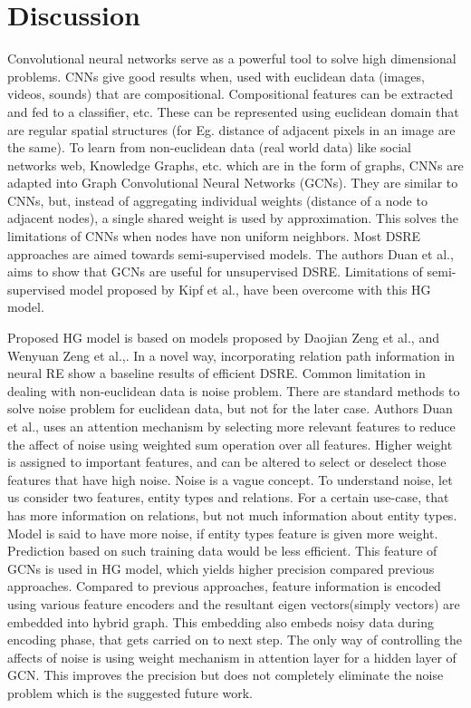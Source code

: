 \chapter{Discussion}
\label{ch:discussion}

Convolutional neural networks serve as a powerful tool to solve high dimensional problems. CNNs give good results when, used with euclidean data (images, videos, sounds) that are compositional. Compositional features can be extracted and fed to a classifier, etc. These can be represented using euclidean domain that are regular spatial structures (for Eg. distance of adjacent pixels in an image are the same). To learn from non-euclidean data (real world data) like social networks web, Knowledge Graphs, etc. which are in the form of graphs, CNNs are adapted into Graph Convolutional Neural Networks (GCNs). They are similar to CNNs, but, instead of aggregating individual weights (distance of a node to adjacent nodes), a single shared weight is used by approximation. This solves the limitations of CNNs when nodes have non uniform neighbors. Most DSRE approaches are aimed towards semi-supervised models\cite{smirnova2018relation}. The authors Duan et al.\cite{duan2019hybrid}, aims to show that GCNs are useful for unsupervised DSRE. Limitations of semi-supervised model proposed by Kipf et al.\cite{kipf2016semi}, have been overcome with this HG model.

\newpar
Proposed HG model is based on models proposed by Daojian Zeng et al.,\cite{zeng2014relation} and Wenyuan Zeng et al.,\cite{zeng2016incorporating}. In a novel way, incorporating relation path information in neural RE show a baseline results of efficient DSRE. Common limitation in dealing with non-euclidean data is noise problem. There are standard methods to solve noise problem for euclidean data\cite{zimek2012survey}, but not for the later case. Authors Duan et al.,\cite{duan2019hybrid} uses an attention mechanism by selecting more relevant features to reduce the affect of noise using weighted sum operation over all features. Higher weight is assigned to important features, and can be altered to select or deselect those features that have high noise. Noise is a vague concept. To understand noise, let us consider two features, entity types and relations. For a certain use-case, that has more information on relations, but not much information about entity types. Model is said to have more noise, if entity types feature is given more weight. Prediction based on such training data would be less efficient. This feature of GCNs is used in HG model, which yields higher precision compared previous approaches. Compared to previous approaches, feature information is encoded using various feature encoders and the resultant eigen vectors(simply vectors) are embedded into hybrid graph. This embedding also embeds noisy data during encoding phase, that gets carried on to next step. The only way of controlling the affects of noise is using weight mechanism in attention layer for a hidden layer of GCN. This improves the precision but does not completely eliminate the noise problem which is the suggested future work.

